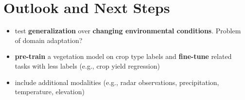 \documentclass[a0]{tumposter}
\begin{document}
\begin{minipage}[t]{0.32\textwidth}


	 \section{Outlook and Next Steps}
%	 
%	 	
	 	\begin{itemize}
	 		\item test \textbf{generalization} over \textbf{changing environmental conditions}. Problem of domain adaptation?
	 		\item \textbf{pre-train} a vegetation model on crop type labels and \textbf{fine-tune} related tasks with less labels (e.g., crop yield regression)
	 		\item include additional modalities ({\small e.g., radar observations, precipitation, temperature, elevation})
	 		
	 	\end{itemize}
	 	
%	 
%	 

	\small
	
	

\end{minipage}
\end{document}
